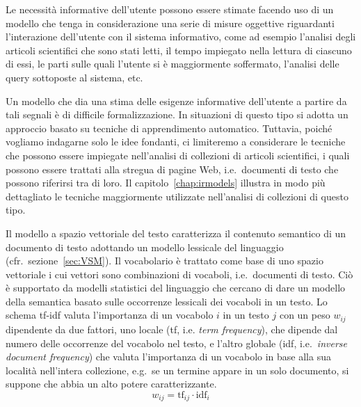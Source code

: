 Le necessità informative dell'utente possono essere stimate facendo uso di un modello che tenga in considerazione una serie di misure oggettive riguardanti l'interazione dell'utente con il sistema informativo, come ad esempio l'analisi degli articoli scientifici che sono stati letti, il tempo impiegato nella lettura di ciascuno di essi, le parti sulle quali l'utente si è maggiormente soffermato, l'analisi delle query sottoposte al sistema, etc.\

Un modello che dia una stima delle esigenze informative dell'utente a partire da tali segnali è di difficile formalizzazione. In situazioni di questo tipo si adotta un approccio basato su tecniche di apprendimento automatico. Tuttavia, poiché vogliamo indagarne solo le idee fondanti, ci limiteremo a considerare le tecniche che possono essere impiegate nell'analisi di collezioni di articoli scientifici, i quali possono essere trattati alla stregua di pagine Web, i.e.\ documenti di testo che possono riferirsi tra di loro. Il capitolo~\ref{chap:irmodels} illustra in modo più dettagliato le tecniche maggiormente utilizzate nell'analisi di collezioni di questo tipo.

Il modello a spazio vettoriale del testo caratterizza il contenuto semantico di un documento di testo adottando un modello lessicale del linguaggio (cfr.\ sezione~\ref{sec:VSM}). Il vocabolario è trattato come base di uno spazio vettoriale i cui vettori sono combinazioni di vocaboli, i.e.\ documenti di testo. Ciò è supportato da modelli statistici del linguaggio che cercano di dare un modello della semantica basato sulle occorrenze lessicali dei vocaboli in un testo. Lo schema tf-idf valuta l'importanza di un vocabolo $i$ in un testo $j$ con un peso $w_{ij}$ dipendente da due fattori, uno locale (tf, i.e. \textit{term frequency}), che dipende dal numero delle occorrenze del vocabolo nel testo, e l'altro globale (idf, i.e.\ \textit{inverse document frequency}) che valuta l'importanza di un vocabolo in base alla sua località nell'intera collezione, e.g.\ se un termine appare in un solo documento, si suppone che abbia un alto potere caratterizzante.
\begin{equation}\label{equaz:idf-wij_definition}
 w_{ij} = \mbox{tf}_{ij} \cdot \mbox{idf}_i
\end{equation}

